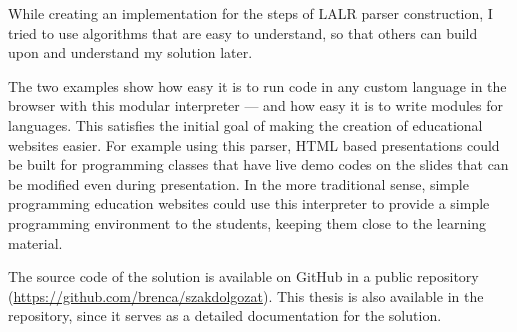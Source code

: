 While creating an implementation for the steps of LALR parser construction, I tried to use algorithms that are easy to understand, so that others can build upon and understand my solution later.

The two examples show how easy it is to run code in any custom language in the browser with this modular interpreter --- and how easy it is to write modules for languages. This satisfies the initial goal of making the creation of educational websites easier. For example using this parser, HTML based presentations could be built for programming classes that have live demo codes on the slides that can be modified even during presentation. In the more traditional sense, simple programming education websites could use this interpreter to provide a simple programming environment to the students, keeping them close to the learning material.

The source code of the solution is available on GitHub in a public repository (\url{https://github.com/brenca/szakdolgozat}). This thesis is also available in the repository, since it serves as a detailed documentation for the solution. 
\endgroup